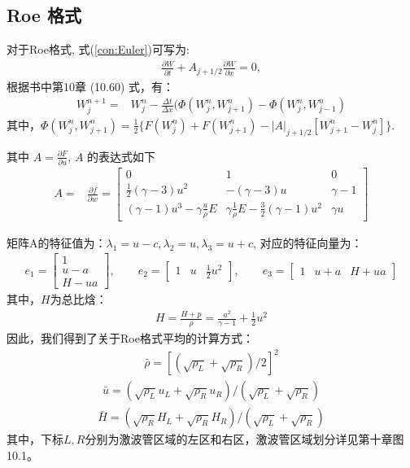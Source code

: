 \documentclass{article}
\begin{document}
\subsection{Roe 格式}
对于Roe格式, 式(\ref{con:Euler})可写为:
\begin{align}
\frac{\partial W}{\partial t} + A_{j+1/2} \frac{\partial W}{\partial x} = 0,
\end{align}
根据\cite{danaila2007}书中第10章 (10.60) 式，有：
\begin{align}
W_j^{n+1} =& W_j^n - \frac{\Delta t}{\Delta x} (\Phi(W^n_j,W_{j+1}^n)-\Phi(W^n_j, W^n_{j-1})
\end{align}
其中，$\Phi(W^n_j, W^n_{j+1})=\frac{1}{2}\{{F(W^n_j)+F(W^n_{j+1})-|A|_{j+1/2}[W^n_{j+1}-W^n_j]}\}$.

其中 $A = \frac{\partial F}{\partial u}$, $A$ 的表达式如下
\begin{align*}
A =& \frac{\partial f}{\partial w} = \left[\begin{array}{ccc} 0 & 1 & 0
\\
\frac{1}{2} (\gamma  - 3) u^2 & -(\gamma - 3) u & \gamma - 1
\\
(\gamma - 1) u^3 - \gamma \frac{u}{\rho} E & \gamma \frac{1}{\rho} E-\frac{3}{2} (\gamma
- 1) u^2 & \gamma u
\end{array}
\right]
\end{align*}
\par
矩阵A的特征值为：$\lambda_1=u-c, \lambda_2=u, \lambda_3=u+c$,
对应的特征向量为：
\begin{align}
e_1=  \left[\begin{array}{c}1\\ u-a\\ H-ua\end{array}\right], \qquad e_2 = \left[\begin{array}{c}1 & u & \frac{1}{2}u^2\end{array}\right], \qquad e_3=\left[\begin{array}{c} 1 & u+a & H+ua\end{array}\right]
\end{align}
其中，$H$为总比焓：
\begin{align}
    H=\frac{H+p}{\rho}=\frac{a^2}{\gamma-1}+\frac{1}{2}u^2
\end{align}
因此，我们得到了关于Roe格式平均的计算方式：
\begin{align}
    \bar{\rho}=[(\sqrt{\rho_L}+\sqrt{\rho_R})/2]^2 
\end{align}    
\begin{align}
    \bar{u} = (\sqrt{\rho_L}u_L+\sqrt{\rho_R}u_R)/(\sqrt{\rho_L}+\sqrt{\rho_R})
\end{align}
\begin{align}
    \bar{H} = (\sqrt{\rho_R}H_L+\sqrt{\rho_R}H_R)/(\sqrt{\rho_L}+\sqrt{\rho_R})
\end{align}
其中，下标$L, R$分别为激波管区域的左区和右区，激波管区域划分详见\cite{danaila2007}第十章图10.1。
\end{document}
